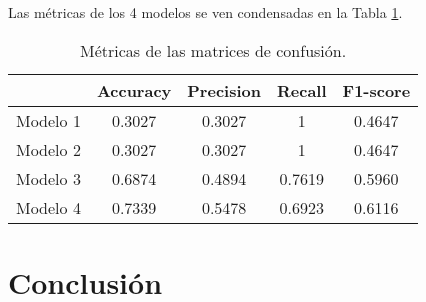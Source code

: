 \documentclass[12pt, letterpaper]{report}
\begin{document}
Las métricas de los 4 modelos se ven condensadas en la Tabla \ref{tab:metricas}.

\begin{table}[H]
    \centering
    \begin{tabular}{|c|c|c|c|c|}
        \hline
        & \textbf{Accuracy} & \textbf{Precision} & \textbf{Recall} & \textbf{F1-score} \\
        \hline
        Modelo 1 & 0.3027 & 0.3027 & 1 & 0.4647 \\
        \hline
        Modelo 2 & 0.3027 & 0.3027 & 1 & 0.4647 \\
        \hline
        Modelo 3 & 0.6874 & 0.4894 & 0.7619 & 0.5960 \\
        \hline
        Modelo 4 & 0.7339 & 0.5478 & 0.6923 & 0.6116 \\
        \hline
    \end{tabular}
    \caption{Métricas de las matrices de confusión.}
    \label{tab:metricas}
\end{table}

\section*{Conclusión}

\printbibliography[title={Referencias}]
\end{document}
